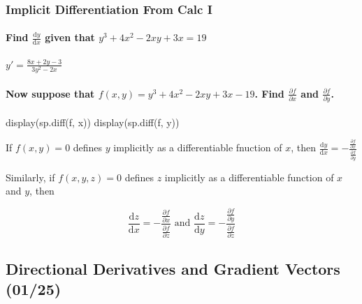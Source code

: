 \documentclass[
  letterpaper,
  DIV=11,
  numbers=noendperiod]{scrartcl}
\let\oldparagraph\paragraph
\renewcommand{\paragraph}[1]{\oldparagraph{#1}\mbox{}}
\newenvironment{Shaded}{\begin{snugshade}}{\end{snugshade}}
\newcommand{\NormalTok}[1]{\textcolor[rgb]{0.00,0.23,0.31}{#1}}
\begin{document}
\subsubsection{Implicit Differentiation From Calc
I}\label{implicit-differentiation-from-calc-i}

\paragraph{\texorpdfstring{Find \(\frac{\mathrm{d}y}{\mathrm{d}x}\)
given that
\(y^3 + 4x^2 - 2xy +3x =  19\)}{Find \textbackslash frac\{\textbackslash mathrm\{d\}y\}\{\textbackslash mathrm\{d\}x\} given that y\^{}3 + 4x\^{}2 - 2xy +3x =  19}}\label{find-fracmathrmdymathrmdx-given-that-y3-4x2---2xy-3x-19}

\(y' = \frac{8x+2y-3}{3y^2-2x}\)

\paragraph{\texorpdfstring{Now suppose that
\(f(x,y) = y^3 + 4x^2 - 2xy +3x - 19\). Find
\(\frac{\partial f}{\partial x}\) and
\(\frac{\partial f}{\partial y}\).}{Now suppose that f(x,y) = y\^{}3 + 4x\^{}2 - 2xy +3x - 19. Find \textbackslash frac\{\textbackslash partial f\}\{\textbackslash partial x\} and \textbackslash frac\{\textbackslash partial f\}\{\textbackslash partial y\}.}}\label{now-suppose-that-fxy-y3-4x2---2xy-3x---19.-find-fracpartial-fpartial-x-and-fracpartial-fpartial-y.}

\begin{Shaded}
\begin{Highlighting}[numbers=left,,]
\NormalTok{display(sp.diff(f, x))}
\NormalTok{display(sp.diff(f, y))}
\end{Highlighting}
\end{Shaded}

If \(f(x,y) = 0\) defines \(y\) implicitly as a differentiable fnuction
of \(x\), then
\(\frac{\mathrm{d}y}{\mathrm{d}x} = -\frac{\frac{\partial f}{\partial x}}{\frac{\partial f}{\partial y}}\)

Similarly, if \(f(x, y, z) = 0\) defines \(z\) implicitly as a
differentiable function of \(x\) and \(y\), then

\[
\frac{\mathrm{d}z}{\mathrm{d}x} = -\frac{\frac{\partial f}{\partial x}}{\frac{\partial f}{\partial z}} \text{ and } \frac{\mathrm{d}z}{\mathrm{d}y} = -\frac{\frac{\partial f}{\partial y}}{\frac{\partial f}{\partial z}}
\]

\subsection{Directional Derivatives and Gradient Vectors
(01/25)}\label{directional-derivatives-and-gradient-vectors-0125}
\end{document}
